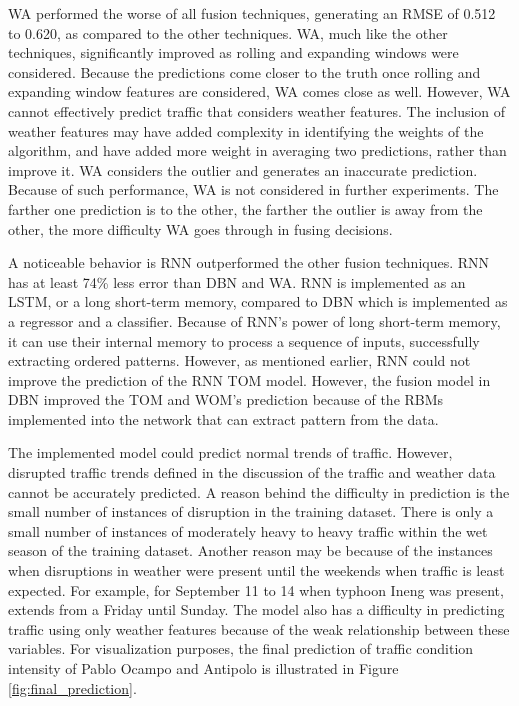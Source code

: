 WA performed the worse of all fusion techniques, generating an RMSE of 0.512 to 0.620, as compared to the other techniques. WA, much like the other techniques, significantly improved as rolling and expanding windows were considered. Because the predictions come closer to the truth once rolling and expanding window features are considered, WA comes close as well. However, WA cannot effectively predict traffic that considers weather features. The inclusion of weather features may have added complexity in identifying the weights of the algorithm, and have added more weight in averaging two predictions, rather than improve it. WA considers the outlier and generates an inaccurate prediction. Because of such performance, WA is not considered in further experiments. The farther one prediction is to the other, the farther the outlier is away from the other, the more difficulty WA goes through in fusing decisions.  

A noticeable behavior is RNN outperformed the other fusion techniques. RNN has at least 74\% less error than DBN and WA. RNN is implemented as an LSTM, or a long short-term memory, compared to DBN which is implemented as a regressor and a classifier. Because of RNN’s power of long short-term memory, it can use their internal memory to process a sequence of inputs, successfully extracting ordered patterns. However, as mentioned earlier, RNN could not improve the prediction of the RNN TOM model. However, the fusion model in DBN improved the TOM and WOM's prediction because of the RBMs implemented into the network that can extract pattern from the data. 

The implemented model could predict normal trends of traffic. However, disrupted traffic trends defined in the discussion of the traffic and weather data cannot be accurately predicted. A reason behind the difficulty in prediction is the small number of instances of disruption in the training dataset. There is only a small number of instances of moderately heavy to heavy traffic within the wet season of the training dataset. Another reason may be because of the instances when disruptions in weather were present until the weekends when traffic is least expected. For example, for September 11 to 14 when typhoon Ineng was present, extends from a Friday until Sunday. The model also has a difficulty in predicting traffic using only weather features because of the weak relationship between these variables. For visualization purposes, the final prediction of traffic condition  intensity of Pablo Ocampo and Antipolo is illustrated in Figure \ref{fig:final_prediction}.

